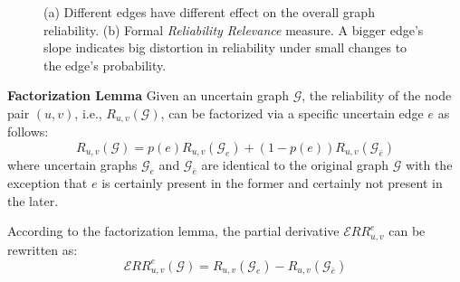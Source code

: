 \begin{figure}
  \vspace{-1em}
    \vspace{-1em}
    \caption{(a) Different edges have different effect on the overall graph reliability. (b) Formal {\em Reliability Relevance } measure. A bigger edge's slope indicates  
     big distortion in reliability under small changes to the edge's probability.}
    \vspace{-0.5em}
\end{figure}


\begin{lemma}
    \textbf{Factorization Lemma}
       Given an uncertain graph $\mathcal{G}$, the reliability of the node pair $(u,v)$, i.e., $R_{u,v}(\mathcal{G})$, can be factorized via a specific uncertain edge $e$ as follows:
    \begin{equation*}
        R_{u,v}(\mathcal{G}) = p(e) R_{u,v} (\mathcal{G}_{e}) + (1-p(e)) R_{u,v} (\mathcal{G}_{\bar{e}} ) 
        \label{eq:fac}
    \end{equation*}
    where uncertain graphs $\mathcal{G}_{e}$ and  $\mathcal{G}_{\bar{e}}$ are identical to the original graph $\mathcal{G}$ with the 
    exception that $e$ is certainly present in the former and certainly not present in the later. 
\end{lemma}





According to the factorization lemma, the partial derivative $\mathcal{E}RR^{e}_{u,v}$ can be rewritten as: 
\begin{equation*}
    \mathcal{E}RR^{e}_{u,v}(\mathcal{G}) = R_{u,v}(\mathcal{G}_{e})-R_{u,v}(\mathcal{G}_{\bar{e}})
\end{equation*}

